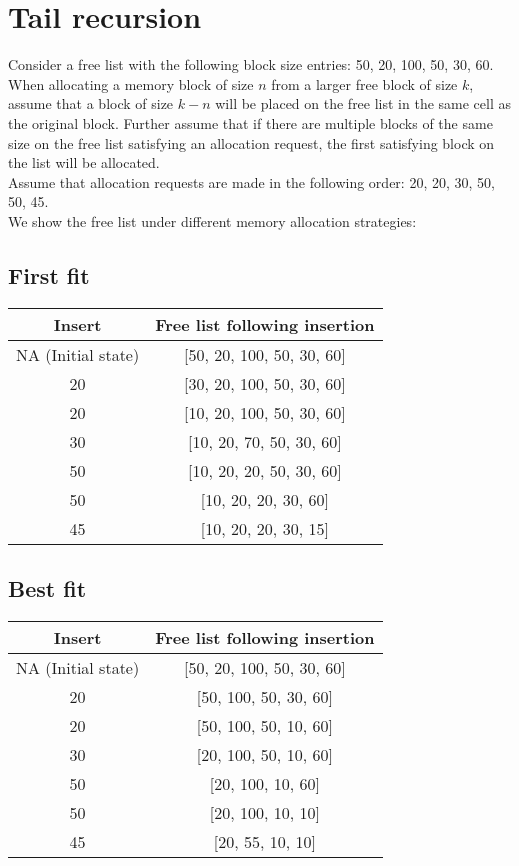 \documentclass[paper=a4, fontsize=11pt]{scrartcl} %
\numberwithin{equation}{section} %
\numberwithin{figure}{section} %
\numberwithin{table}{section} %
\begin{document}
\section{Tail recursion}

Consider a free list with the following block size entries: 50, 20, 100, 50, 30, 60. When allocating a
memory block of size $n$ from a larger free block of size $k$, assume that a block of size $k - n$ will be placed
on the free list in the same cell as the original block. Further assume that if there are multiple blocks
of the same size on the free list satisfying an allocation request, the first satisfying block on the list will
be allocated.\\
Assume that allocation requests are made in the following order: 20, 20, 30, 50, 50, 45.\\

We show the free list under different memory allocation strategies:

\subsection{First fit}

\begin{center}
\begin{tabular} {| c | c |}
\hline
\textbf{Insert} & \textbf{Free list following insertion} \\
\hline
NA (Initial state) & [50, 20, 100, 50, 30, 60] \\
\hline
20& [30, 20, 100, 50, 30, 60] \\
\hline
20 & [10, 20, 100, 50, 30, 60] \\
\hline
30 & [10, 20, 70, 50, 30, 60] \\
\hline
50 & [10, 20, 20, 50, 30, 60] \\
\hline
50 & [10, 20, 20, 30, 60] \\
\hline
45 & [10, 20, 20, 30, 15] \\
\hline
\end{tabular}
\end{center}

\subsection{Best fit}

\begin{center}
\begin{tabular} {| c | c |}
\hline
\textbf{Insert} & \textbf{Free list following insertion} \\
\hline
NA (Initial state) & [50, 20, 100, 50, 30, 60] \\
\hline
20 & [50, 100, 50, 30, 60] \\
\hline
20 & [50, 100, 50, 10, 60] \\
\hline
30 & [20, 100, 50, 10, 60] \\
\hline
50 & [20, 100, 10, 60] \\
\hline
50 & [20, 100, 10, 10] \\
\hline
45 & [20, 55, 10, 10] \\
\hline
\end{tabular}
\end{center}
\end{document}
